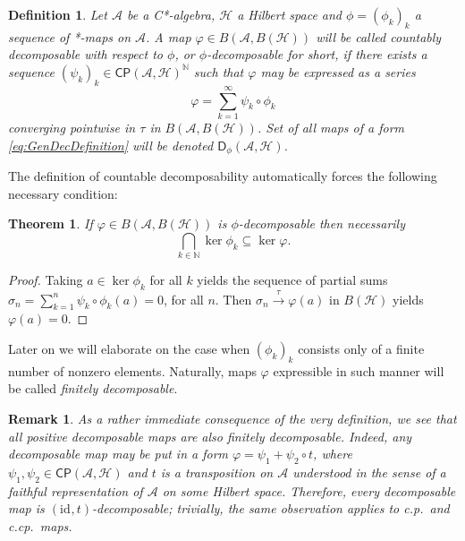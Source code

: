 \documentclass[reqno]{amsart}
\newtheorem{theorem}{Theorem}
\theoremstyle{plain}
\newtheorem{definition}{Definition}
\newtheorem{remark}{Remark}
\numberwithin{equation}{section}
\numberwithin{theorem}{section}
\numberwithin{lemma}{section}
\numberwithin{definition}{section}
\numberwithin{corollary}{section}
\numberwithin{remark}{section}
\newcommand{\naturals}{\mathbb{N}}
\newcommand{\id}[1]{\mathrm{id}_{#1}}
\newcommand{\hilbert}{\mathcal{H}}
\newcommand{\cp}[2]{\mathsf{CP}(#1,#2)}
\newcommand{\gdec}[3]{\mathsf{D}_{#1}(#2,#3)}
\newcommand{\transpose}{t}
\begin{document}
\begin{definition}\label{def:GDM}
    Let $\mathscr{A}$ be a C*-algebra, $\hilbert$ a Hilbert space and $\phi = \left(\phi_k\right)_k$ a sequence of *-maps on $\mathscr{A}$. A map $\varphi \in B(\mathscr{A},B(\hilbert))$ will be called countably decomposable with respect to $\phi$, or $\phi$-decomposable for short, if there exists a sequence $\left(\psi_k\right)_k \in \cp{\mathscr{A}}{\hilbert}^\naturals$ such that $\varphi$ may be expressed as a series
    \begin{equation}\label{eq:GenDecDefinition}
        \varphi = \sum_{k=1}^{\infty} \psi_k \circ \phi_k
    \end{equation}
    converging pointwise in $\tau$ in $B(\mathscr{A},B(\hilbert))$. Set of all maps of a form \eqref{eq:GenDecDefinition} will be denoted $\gdec{\phi}{\mathscr{A}}{\hilbert}$.
\end{definition}
The definition of countable decomposability automatically forces the following necessary condition:
\begin{theorem}
    If $\varphi \in B(\mathscr{A},B(\hilbert))$ is $\phi$-decomposable then necessarily
    \begin{equation}\label{eq:KernelCondition}
        \bigcap_{k\in\naturals}\ker{\phi_k} \subseteq \ker{\varphi}.
    \end{equation}
\end{theorem}

\begin{proof}
    Taking $a\in\ker{\phi_k}$ for all $k$ yields the sequence of partial sums $\sigma_n = \sum_{k=1}^{n} \psi_k \circ \phi_k (a) = 0$, for all $n$. Then $\sigma_n \xrightarrow{\tau} \varphi(a)$ in $B(\hilbert)$ yields $\varphi(a) = 0$.
\end{proof}

Later on we will elaborate on the case when $\left(\phi_k\right)_k$ consists only of a finite number of nonzero elements. Naturally, maps $\varphi$ expressible in such manner will be called \emph{finitely decomposable}.

\begin{remark}
    As a rather immediate consequence of the very definition, we see that all positive decomposable maps are also finitely decomposable. Indeed, any decomposable map may be put in a form $\varphi = \psi_1 + \psi_2 \circ \transpose$, where $\psi_1, \psi_2 \in \cp{\mathscr{A}}{\hilbert}$ and $t$ is a transposition on $\mathscr{A}$ understood in the sense of a faithful representation of $\mathscr{A}$ on some Hilbert space. Therefore, every decomposable map is $(\id{},\transpose)$-decomposable; trivially, the same observation applies to c.p.~and c.cp.~maps.
\end{remark}
\end{document}
